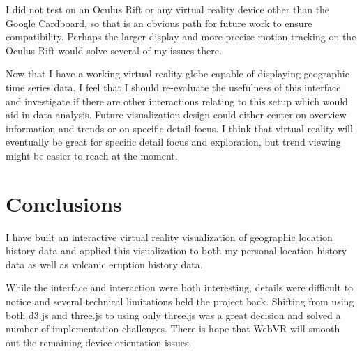 \documentclass[conference]{acmsiggraph}
\begin{document}
I did not test on an Oculus Rift or any virtual reality device other than the
Google Cardboard, so that is an obvious path for future work to ensure
compatibility. Perhaps the larger display and more precise motion tracking on
the Oculus Rift would solve several of my issues there.

Now that I have a working virtual reality globe capable of displaying geographic
time series data, I feel that I should re-evaluate the usefulness of this
interface and investigate if there are other interactions relating to this setup
which would aid in data analysis. Future visualization design could either
center on overview information and trends or on specific detail focus. I think
that virtual reality will eventually be great for specific detail focus and
exploration, but trend viewing might be easier to reach at the moment.

\section{Conclusions}

I have built an interactive virtual reality visualization of geographic
location history data and applied this visualization to both my personal
location history data as well as volcanic eruption history data.

While the interface and interaction were both interesting, details were
difficult to notice and several technical limitations held the project back.
Shifting from using both d3.js and three.js to using only three.js was a great
decision and solved a number of implementation challenges. There is hope that
WebVR will smooth out the remaining device orientation issues.



\end{document}
